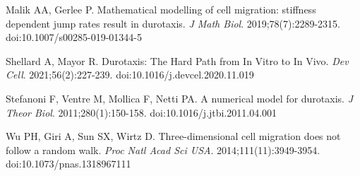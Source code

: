 \documentclass[12pt]{article}
\begin{document}
\begin{thebibliography}{4}

   Malik AA, Gerlee P. Mathematical modelling of cell migration: stiffness dependent jump rates result in durotaxis. 
   \emph{J Math Biol}. 2019;78(7):2289-2315. doi:10.1007/s00285-019-01344-5

   Shellard A, Mayor R. Durotaxis: The Hard Path from In Vitro to In Vivo. 
   \emph{Dev Cell}. 2021;56(2):227-239. doi:10.1016/j.devcel.2020.11.019

   Stefanoni F, Ventre M, Mollica F, Netti PA. A numerical model for durotaxis. 
   \emph{J Theor Biol}. 2011;280(1):150-158. doi:10.1016/j.jtbi.2011.04.001

   Wu PH, Giri A, Sun SX, Wirtz D. Three-dimensional cell migration does not follow a random walk. 
   \emph{Proc Natl Acad Sci USA}. 2014;111(11):3949-3954. doi:10.1073/pnas.1318967111

\end{thebibliography}
\end{document}

